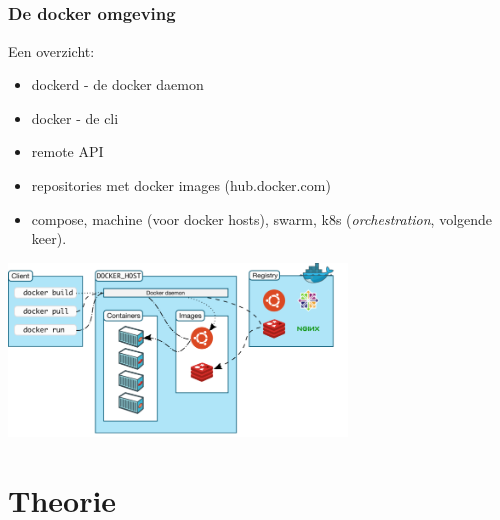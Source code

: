 \subsection{}
\begin{styleframe}
	\frametitle{De docker omgeving}
Een overzicht:
\begin{itemize}
	\item dockerd - de docker daemon
	\pause
	\item docker - de cli
	\pause
	\item remote API
	\pause
	\item repositories met docker images (hub.docker.com)
	\pause
	\item compose, machine (voor docker hosts), swarm, k8s ({\it orchestration}, volgende keer).
	\pause
\end{itemize}
\includegraphics[width=9cm]{img/docker.png}\\
\end{styleframe}

\section{Theorie}
